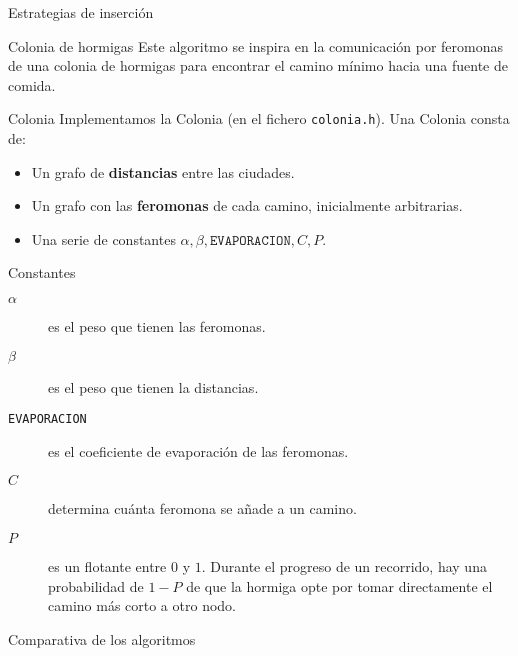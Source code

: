 \begin{frame}{Estrategias de inserción}
\end{frame}

\begin{frame}{Colonia de hormigas}
Este algoritmo se inspira en la comunicación por feromonas
de una colonia de hormigas para encontrar el camino mínimo hacia una fuente de comida.
\end{frame}

\begin{frame}{Colonia}
Implementamos la Colonia (en el fichero \texttt{colonia.h}). Una Colonia consta de:

\begin{itemize}
  \item Un grafo de \textbf{distancias} entre las ciudades.
  \item Un grafo con las \textbf{feromonas} de cada camino, inicialmente arbitrarias.
  \item Una serie de constantes $\alpha, \beta, \texttt{EVAPORACION}, C, P$.
\end{itemize}
\end{frame}

\begin{frame}{Constantes}
\begin{description}
  \item[$\alpha$] es el peso que tienen las feromonas.
  \item[$\beta$] es el peso que tienen la distancias.
  \item[\texttt{EVAPORACION}] es el coeficiente de evaporación de las feromonas.
  \item[$C$] determina cuánta feromona se añade a un camino.
  \item[$P$] es un flotante entre $0$ y $1$. Durante el progreso de un recorrido, hay
  una probabilidad de $1-P$ de que la hormiga opte por tomar directamente el camino
  más corto a otro nodo.
\end{description}
\end{frame}

\begin{frame}{Comparativa de los algoritmos}
\end{frame}
